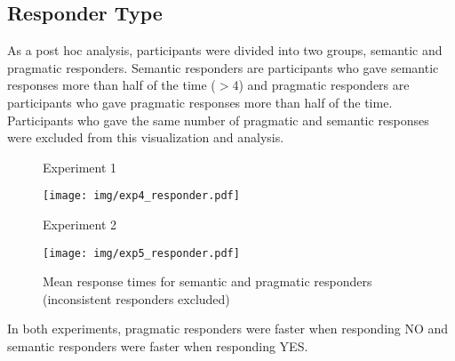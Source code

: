 \documentclass[12pt]{article}
\begin{document}
\subsection*{Responder Type}
As a post hoc analysis, participants were divided into two groups, semantic and pragmatic responders. Semantic responders are participants who gave semantic responses more than half of the time ($>$4) and pragmatic responders are participants who gave pragmatic responses more than half of the time. Participants who gave the same number of pragmatic and semantic responses were excluded from this visualization and analysis. 

\begin{figure}[!ht] 
    \begin{minipage}{.5\textwidth}
        \caption*{Experiment 1}
        \texttt{[image: img/exp4\_responder.pdf]}
    \end{minipage}%
    \begin{minipage}{.5\textwidth}
        \caption*{Experiment 2}
        \texttt{[image: img/exp5\_responder.pdf]}
    \end{minipage}%
    \caption{Mean response times for semantic and pragmatic responders (inconsistent responders excluded)}
\end{figure}

In both experiments, pragmatic responders were faster when responding NO and semantic responders were faster when responding YES. 

\pagebreak


\end{document}
